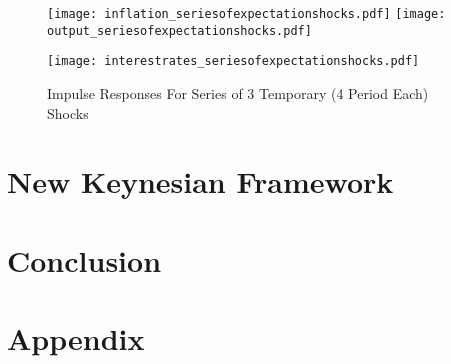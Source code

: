 \documentclass[12pt]{article}
\newcommand{\1}{\mathbbm 1}
\begin{document}
	\begin{figure}[H]
	\texttt{[image: inflation\_seriesofexpectationshocks.pdf]}
	\hfill
	\texttt{[image: output\_seriesofexpectationshocks.pdf]}
	\hfill
	\begin{Center}
		\texttt{[image: interestrates\_seriesofexpectationshocks.pdf]}
	\end{Center}
	\caption{Impulse Responses For Series of 3 Temporary (4 Period Each) Shocks}
\end{figure}
		
		
		\newpage
		
		
			
		
		\section{New Keynesian Framework}
		
		\newpage
		
		\section{Conclusion}
		
		
		
		
		\newpage
		
		
		
		
		
		\section{Appendix}
		
	
	
	\newpage
	\singlespacing
	\newpage
	
	
	\clearpage
	
	
	
	
	
	
	
	
	
\end{document}

